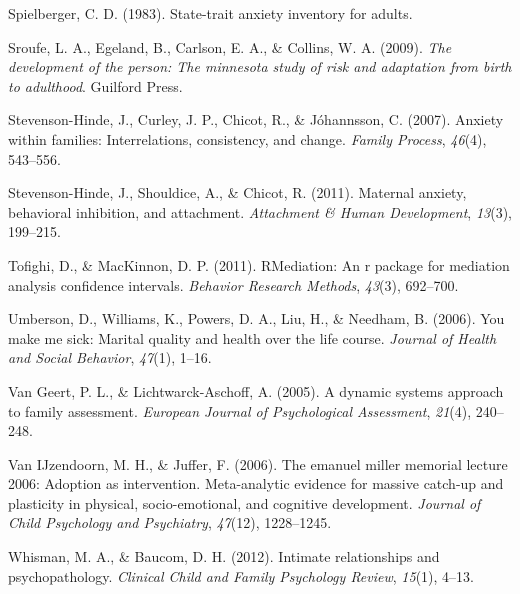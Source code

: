 \documentclass[man]{apa6}
\begin{document}
\leavevmode\hypertarget{ref-spielberger1983state}{}%
Spielberger, C. D. (1983). State-trait anxiety inventory for adults.

\leavevmode\hypertarget{ref-sroufe2009development}{}%
Sroufe, L. A., Egeland, B., Carlson, E. A., \& Collins, W. A. (2009). \emph{The development of the person: The minnesota study of risk and adaptation from birth to adulthood}. Guilford Press.

\leavevmode\hypertarget{ref-stevenson2007anxiety}{}%
Stevenson-Hinde, J., Curley, J. P., Chicot, R., \& Jóhannsson, C. (2007). Anxiety within families: Interrelations, consistency, and change. \emph{Family Process}, \emph{46}(4), 543--556.

\leavevmode\hypertarget{ref-stevenson2011maternal}{}%
Stevenson-Hinde, J., Shouldice, A., \& Chicot, R. (2011). Maternal anxiety, behavioral inhibition, and attachment. \emph{Attachment \& Human Development}, \emph{13}(3), 199--215.

\leavevmode\hypertarget{ref-monte}{}%
Tofighi, D., \& MacKinnon, D. P. (2011). RMediation: An r package for mediation analysis confidence intervals. \emph{Behavior Research Methods}, \emph{43}(3), 692--700.

\leavevmode\hypertarget{ref-umberson2006you}{}%
Umberson, D., Williams, K., Powers, D. A., Liu, H., \& Needham, B. (2006). You make me sick: Marital quality and health over the life course. \emph{Journal of Health and Social Behavior}, \emph{47}(1), 1--16.

\leavevmode\hypertarget{ref-van2005dynamic}{}%
Van Geert, P. L., \& Lichtwarck-Aschoff, A. (2005). A dynamic systems approach to family assessment. \emph{European Journal of Psychological Assessment}, \emph{21}(4), 240--248.

\leavevmode\hypertarget{ref-van2006emanuel}{}%
Van IJzendoorn, M. H., \& Juffer, F. (2006). The emanuel miller memorial lecture 2006: Adoption as intervention. Meta-analytic evidence for massive catch-up and plasticity in physical, socio-emotional, and cognitive development. \emph{Journal of Child Psychology and Psychiatry}, \emph{47}(12), 1228--1245.

\leavevmode\hypertarget{ref-whisman2012intimate}{}%
Whisman, M. A., \& Baucom, D. H. (2012). Intimate relationships and psychopathology. \emph{Clinical Child and Family Psychology Review}, \emph{15}(1), 4--13.

\endgroup
\end{document}
